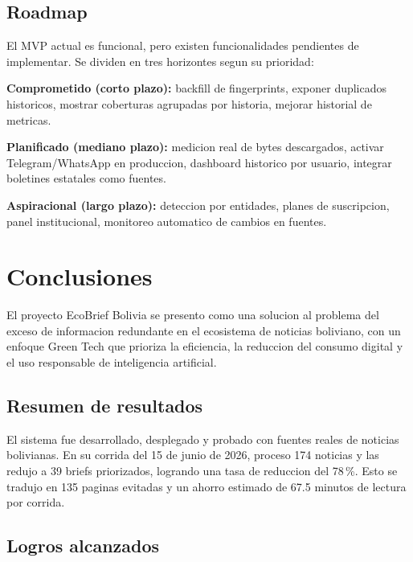 \documentclass[12pt,oneside]{report}
\begin{document}
\section{Roadmap}

El MVP actual es funcional, pero existen funcionalidades pendientes de implementar. Se dividen en tres horizontes segun su prioridad:

\textbf{Comprometido (corto plazo):} backfill de fingerprints, exponer duplicados historicos, mostrar coberturas agrupadas por historia, mejorar historial de metricas.

\textbf{Planificado (mediano plazo):} medicion real de bytes descargados, activar Telegram/WhatsApp en produccion, dashboard historico por usuario, integrar boletines estatales como fuentes.

\textbf{Aspiracional (largo plazo):} deteccion por entidades, planes de suscripcion, panel institucional, monitoreo automatico de cambios en fuentes.

\chapter*{Conclusiones}

El proyecto EcoBrief Bolivia se presento como una solucion al problema del exceso de informacion redundante en el ecosistema de noticias boliviano, con un enfoque Green Tech que prioriza la eficiencia, la reduccion del consumo digital y el uso responsable de inteligencia artificial.

\section*{Resumen de resultados}

El sistema fue desarrollado, desplegado y probado con fuentes reales de noticias bolivianas. En su corrida del 15 de junio de 2026, proceso 174 noticias y las redujo a 39 briefs priorizados, logrando una tasa de reduccion del 78\,\%. Esto se tradujo en 135 paginas evitadas y un ahorro estimado de 67.5 minutos de lectura por corrida.

\section*{Logros alcanzados}
\end{document}
